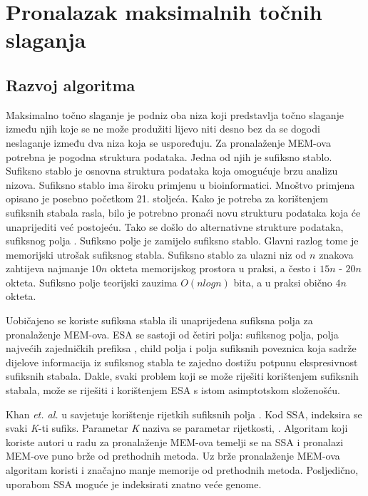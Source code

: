 \documentclass[times, utf8, seminar, numeric]{fer}
\begin{document}
\chapter{Pronalazak maksimalnih točnih slaganja}

\section{Razvoj algoritma}

Maksimalno točno slaganje  je podniz oba niza koji predstavlja točno slaganje između njih koje se ne može produžiti lijevo niti desno bez da se dogodi neslaganje između dva niza koja se uspoređuju. Za pronalaženje MEM-ova potrebna je pogodna struktura podataka. Jedna od njih je sufiksno stablo. Sufiksno stablo je osnovna struktura podataka koja omogućuje brzu analizu nizova. Sufiksno stablo ima široku primjenu u bioinformatici. Mnoštvo primjena opisano je posebno početkom 21. stoljeća. Kako je potreba za korištenjem sufiksnih stabala rasla, bilo je potrebno pronaći novu strukturu podataka koja će unaprijediti već postojeću. Tako se došlo do alternativne strukture podataka, sufiksnog polja . Sufiksno polje je zamijelo sufiksno stablo. Glavni razlog tome je memorijski utrošak sufiksnog stabla. Sufiksno stablo za ulazni niz od $n$ znakova zahtijeva najmanje $10n$ okteta memorijskog prostora u praksi, a često i $15n$ - $20n$ okteta. Sufiksno polje teorijski zauzima $O(n log n)$ bita, a u praksi obično $4n$ okteta.

Uobičajeno se koriste sufiksna stabla ili unaprijeđena sufiksna polja  za pronalaženje MEM-ova. ESA se sastoji od četiri polja: sufiksnog polja, polja najvećih zajedničkih prefiksa , child polja i polja sufiksnih poveznica  koja sadrže dijelove informacija iz sufiksnog stabla te zajedno dostižu potpunu ekspresivnost sufiksnih stabala. Dakle, svaki problem koji se može riješiti korištenjem sufiksnih stabala, može se riješiti i korištenjem ESA s istom asimptotskom složenošću.

Khan \textit{et. al.} u \cite{ssa} savjetuje korištenje rijetkih sufiksnih polja . Kod SSA, indeksira se svaki \textit{K}-ti sufiks. Parametar \textit{K} naziva se parametar rijetkosti, . Algoritam koji koriste autori u radu \cite{ssa} za pronalaženje MEM-ova temelji se na SSA i pronalazi MEM-ove puno brže od prethodnih metoda. Uz brže pronalaženje MEM-ova algoritam koristi i značajno manje memorije od prethodnih metoda. Posljedično, uporabom SSA moguće je indeksirati znatno veće genome.
\end{document}
